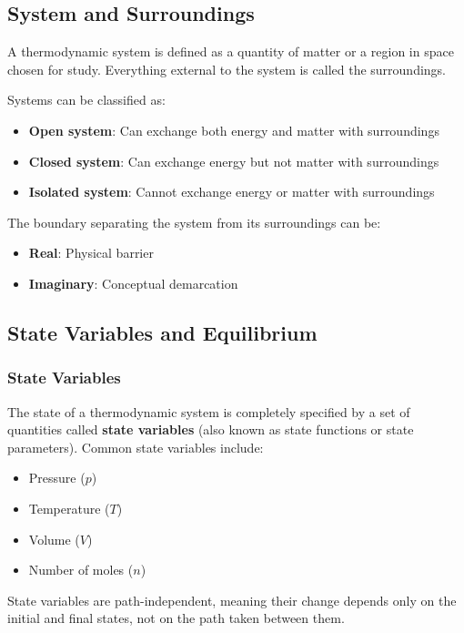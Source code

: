 \documentclass{article}
\theoremstyle{definition}
\begin{document}
\subsection{System and Surroundings}

A thermodynamic system is defined as a quantity of matter or a region in space chosen for study. Everything external to the system is called the surroundings.

Systems can be classified as:
\begin{itemize}
    \item \textbf{Open system}: Can exchange both energy and matter with surroundings
    \item \textbf{Closed system}: Can exchange energy but not matter with surroundings
    \item \textbf{Isolated system}: Cannot exchange energy or matter with surroundings
\end{itemize}

The boundary separating the system from its surroundings can be:
\begin{itemize}
    \item \textbf{Real}: Physical barrier
    \item \textbf{Imaginary}: Conceptual demarcation
\end{itemize}

\subsection{State Variables and Equilibrium}

\subsubsection{State Variables}
The state of a thermodynamic system is completely specified by a set of quantities called \textbf{state variables} (also known as state functions or state parameters). Common state variables include:

\begin{itemize}
    \item Pressure ($p$)
    \item Temperature ($T$)
    \item Volume ($V$)
    \item Number of moles ($n$)
\end{itemize}

State variables are path-independent, meaning their change depends only on the initial and final states, not on the path taken between them.
\end{document}
